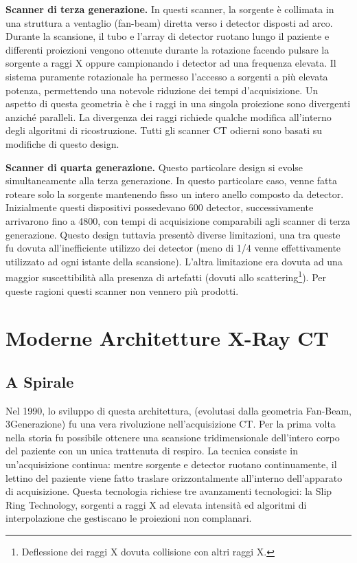 \documentclass[a4paper,12pt, doubleside]{report}
\begin{document}
                \bigskip
                \par
                    \textbf{Scanner di terza generazione.} In questi scanner, la sorgente è collimata in una struttura a ventaglio (fan-beam) diretta verso i detector disposti ad arco. Durante la scansione, il tubo e l’array di detector ruotano lungo il paziente e differenti proiezioni vengono ottenute durante la rotazione facendo pulsare la sorgente a raggi X oppure campionando i detector ad una frequenza elevata. Il sistema puramente rotazionale ha permesso l’accesso a sorgenti a più elevata potenza, permettendo una notevole riduzione dei tempi d’acquisizione. Un aspetto di questa geometria è che i raggi in una singola proiezione sono divergenti anziché paralleli. La divergenza dei raggi richiede qualche modifica all’interno degli algoritmi di ricostruzione. Tutti gli scanner CT odierni sono basati su modifiche di questo design. 
                            
                \bigskip
                \par
                    \textbf{Scanner di quarta generazione.} Questo particolare design si evolse simultaneamente alla terza generazione. In questo particolare caso, venne fatta roteare solo la sorgente mantenendo fisso un intero anello composto da detector. Inizialmente questi dispositivi possedevano 600 detector, successivamente arrivarono fino a 4800, con tempi di acquisizione comparabili agli scanner di terza generazione. Questo design tuttavia presentò diverse limitazioni, una tra queste fu dovuta all’inefficiente utilizzo dei detector (meno di 1/4 venne effettivamente utilizzato ad ogni istante della scansione). L'altra limitazione era dovuta ad una maggior suscettibilità alla presenza di artefatti (dovuti allo scattering\footnote{Deflessione dei raggi X dovuta collisione con altri raggi X.}). Per queste ragioni questi scanner non vennero più prodotti.
                            
        \section{Moderne Architetture X-Ray CT}
            \subsection{A Spirale}
                \par
                    Nel 1990, lo sviluppo di questa architettura, (evolutasi dalla geometria Fan-Beam, 3\degree Generazione) fu una vera rivoluzione nell'acquisizione CT. Per la prima volta nella storia fu possibile ottenere una scansione tridimensionale dell'intero corpo del paziente con un unica trattenuta di respiro.
                    La tecnica consiste in un'acquisizione continua: mentre sorgente e detector ruotano continuamente, il lettino del paziente viene fatto traslare orizzontalmente all'interno dell'apparato di acquisizione. Questa tecnologia richiese tre avanzamenti tecnologici: la Slip Ring Technology, sorgenti a raggi X ad elevata intensità ed algoritmi di interpolazione che gestiscano le proiezioni non complanari.
                    
\end{document}
